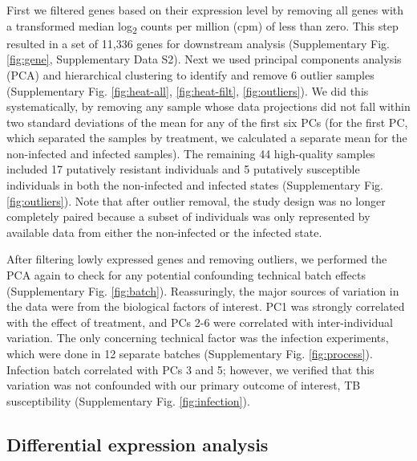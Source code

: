 \documentclass[fleqn,10pt]{wlscirep}
\begin{document}
First we filtered genes based on their expression level by removing
all genes with a transformed median log\textsubscript{2} counts per
million (cpm) of less than zero. This step resulted in a set of 11,336
genes for downstream analysis (Supplementary Fig. \ref{fig:gene},
Supplementary Data S2). Next we used principal components analysis
(PCA) and hierarchical clustering to identify and remove 6 outlier
samples (Supplementary Fig. \ref{fig:heat-all}, \ref{fig:heat-filt},
\ref{fig:outliers}). We did this systematically, by removing any
sample whose data projections did not fall within two standard
deviations of the mean for any of the first six PCs (for the first PC,
which separated the samples by treatment, we calculated a separate
mean for the non-infected and infected samples). The remaining 44
high-quality samples included 17 putatively resistant individuals and
5 putatively susceptible individuals in both the non-infected and
infected states (Supplementary Fig. \ref{fig:outliers}). Note that
after outlier removal, the study design was no longer completely
paired because a subset of individuals was only represented by
available data from either the non-infected or the infected state.

After filtering lowly expressed genes and removing outliers, we
performed the PCA again to check for any potential confounding
technical batch effects (Supplementary Fig. \ref{fig:batch}).
Reassuringly, the major sources of variation in the data were from the
biological factors of interest. PC1 was strongly correlated with the
effect of treatment, and PCs 2-6 were correlated with inter-individual
variation. The only concerning technical factor was the infection
experiments, which were done in 12 separate batches (Supplementary
Fig. \ref{fig:process}). Infection batch correlated with PCs 3 and 5;
however, we verified that this variation was not confounded with our
primary outcome of interest, TB susceptibility (Supplementary Fig.
\ref{fig:infection}).
\subsection*{Differential expression analysis}
\end{document}
